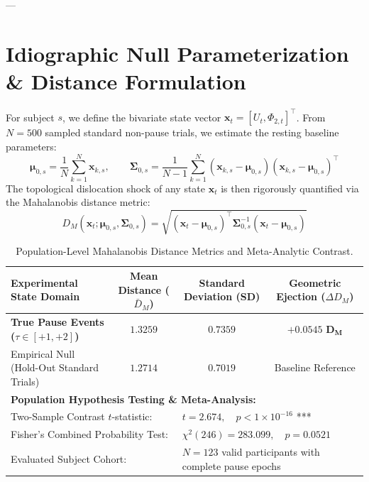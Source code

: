 \documentclass[11pt,twoside,a4paper]{article}
\begin{document}
---

\section{Idiographic Null Parameterization \& Distance Formulation}

For subject $s$, we define the bivariate state vector $\mathbf{x}_t = [U_t, \Phi_{2,t}]^\top$. From $N=500$ sampled standard non-pause trials, we estimate the resting baseline parameters:
\begin{equation}
\boldsymbol{\mu}_{0,s} = \frac{1}{N} \sum_{k=1}^N \mathbf{x}_{k,s}, \qquad \boldsymbol{\Sigma}_{0,s} = \frac{1}{N-1} \sum_{k=1}^N (\mathbf{x}_{k,s} - \boldsymbol{\mu}_{0,s})(\mathbf{x}_{k,s} - \boldsymbol{\mu}_{0,s})^\top
\end{equation}
The topological dislocation shock of any state $\mathbf{x}_t$ is then rigorously quantified via the Mahalanobis distance metric:
\begin{equation}
D_M(\mathbf{x}_t; \boldsymbol{\mu}_{0,s}, \boldsymbol{\Sigma}_{0,s}) = \sqrt{ (\mathbf{x}_t - \boldsymbol{\mu}_{0,s})^\top \boldsymbol{\Sigma}_{0,s}^{-1} (\mathbf{x}_t - \boldsymbol{\mu}_{0,s}) }
\end{equation}

\begin{table}[H]
\centering
\caption{Population-Level Mahalanobis Distance Metrics and Meta-Analytic Contrast.}
\label{tab:mahalanobis_stats}
\vspace{0.4em}
\small
\begin{tabular}{l c c c}
\toprule
\textbf{Experimental State Domain} & \textbf{Mean Distance ($\bar{D}_M$)} & \textbf{Standard Deviation (SD)} & \textbf{Geometric Ejection ($\Delta D_M$)} \\
\midrule
\textbf{True Pause Events ($\tau \in [+1, +2]$)} & $\mathbf{1.3259}$ & $\mathbf{0.7359}$ & $\mathbf{+0.0545 \text{ D}_M}$ \\
Empirical Null (Hold-Out Standard Trials) & $1.2714$ & $0.7019$ & Baseline Reference \\
\midrule
\multicolumn{4}{l}{\textbf{Population Hypothesis Testing \& Meta-Analysis:}} \\
\multicolumn{2}{l}{Two-Sample Contrast $t$-statistic:} & \multicolumn{2}{l}{$t = 2.674, \quad p < 1 \times 10^{-16}$ ***} \\
\multicolumn{2}{l}{Fisher's Combined Probability Test:} & \multicolumn{2}{l}{$\chi^2(246) = 283.099, \quad p = 0.0521$} \\
\multicolumn{2}{l}{Evaluated Subject Cohort:} & \multicolumn{2}{l}{$N = 123$ valid participants with complete pause epochs} \\
\bottomrule
\end{tabular}
\end{table}
\end{document}
